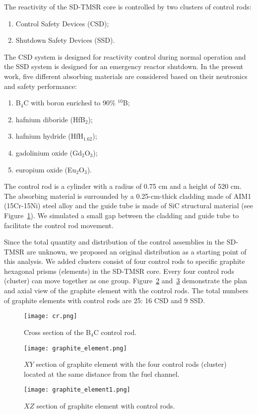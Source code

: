 The reactivity of the SD-TMSR core is controlled by two clusters of control 
rods:
\begin{enumerate}
\item Control Safety Devices (CSD);
\item Shutdown Safety Devices (SSD).
\end{enumerate}
The CSD system is designed for reactivity control during normal operation and the SSD system is designed for an emergency reactor shutdown.
In the present work, five different absorbing materials are considered based on their neutronics and safety performance:
\begin{enumerate}
\item B$_4$C with boron enriched to 90\% $^{10}$B;
\item hafnium diboride (HfB$_2$);
\item hafnium hydride (HfH$_{1.62}$);
\item gadolinium oxide (Gd$_2$O$_3$);
\item europium oxide (Eu$_2$O$_3$).
\end{enumerate}

The control rod is a cylinder with a radius of 0.75 cm and a height of 520 cm. 
The absorbing material is surrounded by a 0.25-cm-thick cladding made of AIM1 
(15Cr-15Ni) steel alloy \cite{SERAN2017285} and the guide tube is made of 
SiC structural material (see Figure~\ref{fig:cr}). We simulated a small gap between the 
cladding and guide tube to facilitate the control rod movement.

Since the total quantity and distribution of the control assemblies in the SD-TMSR are unknown, we proposed an original distribution as a starting point of this analysis. We added clusters consist of four control rods to specific graphite hexagonal prisms (elements) in the SD-TMSR core. Every four control rods (cluster) can move together as one group. Figure~\ref{fig:graphite_elemen} and~\ref{fig:graphite_elemen1} demonstrate the plan and axial view of the graphite element with the control rods. The total numbers of graphite elements with control rods are 25: 16 CSD and 9 SSD.
\begin{figure}[t!]  %
	\centering
	\hspace{+0.65in} 
	\texttt{[image: cr.png]}
	\caption{Cross section of the B$_4$C control rod.}
	\label{fig:cr}
\end{figure}
\begin{figure}[t!]  %
	\centering
	\hspace{+0.65in}
	\texttt{[image: graphite\_element.png]}
	\caption{$XY$ section of graphite element with the four control rods 
	(cluster) located at the same distance from the fuel channel.}
	\label{fig:graphite_elemen}
\end{figure}
\begin{figure}[t!]  %
	\centering
	\hspace{+0.65in}
	\texttt{[image: graphite\_element1.png]}
	\caption{$XZ$ section of graphite element with control rods.}
	\label{fig:graphite_elemen1}
\end{figure}

